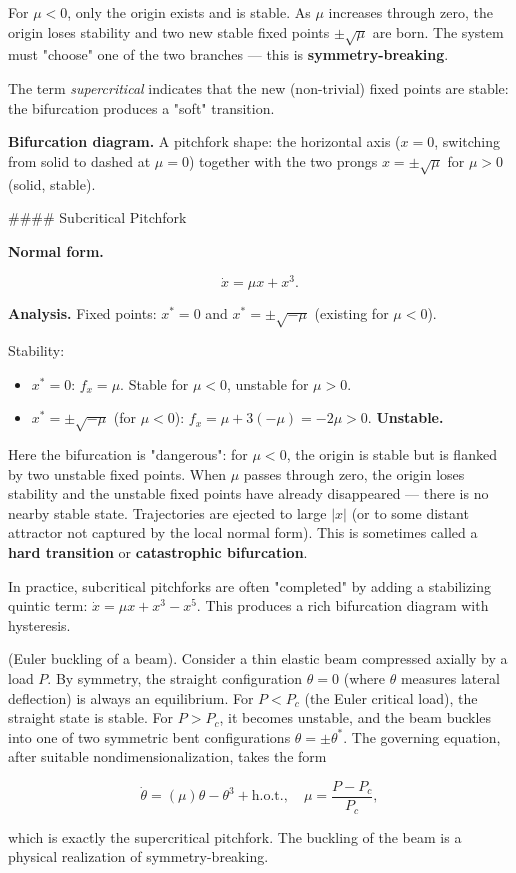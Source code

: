 For $\mu < 0$, only the origin exists and is stable. As $\mu$ increases through zero, the origin loses stability and two new stable fixed points $\pm\sqrt{\mu}$ are born. The system must "choose" one of the two branches --- this is \textbf{symmetry-breaking}.

The term \textit{supercritical} indicates that the new (non-trivial) fixed points are stable: the bifurcation produces a "soft" transition.

\textbf{Bifurcation diagram.} A pitchfork shape: the horizontal axis ($x = 0$, switching from solid to dashed at $\mu = 0$) together with the two prongs $x = \pm\sqrt{\mu}$ for $\mu > 0$ (solid, stable).

\#\#\#\# Subcritical Pitchfork

\textbf{Normal form.}

\begin{equation}\label{eq:5.4}\tag{5.4}
\dot{x} = \mu x + x^3.
\end{equation}

\textbf{Analysis.} Fixed points: $x^* = 0$ and $x^* = \pm\sqrt{-\mu}$ (existing for $\mu < 0$).

Stability:
\begin{itemize}[nosep]
  \item $x^* = 0$: $f_x = \mu$. Stable for $\mu < 0$, unstable for $\mu > 0$.
  \item $x^* = \pm\sqrt{-\mu}$ (for $\mu < 0$): $f_x = \mu + 3(-\mu) = -2\mu > 0$. \textbf{Unstable.}
\end{itemize}

Here the bifurcation is "dangerous": for $\mu < 0$, the origin is stable but is flanked by two unstable fixed points. When $\mu$ passes through zero, the origin loses stability and the unstable fixed points have already disappeared --- there is no nearby stable state. Trajectories are ejected to large $|x|$ (or to some distant attractor not captured by the local normal form). This is sometimes called a \textbf{hard transition} or \textbf{catastrophic bifurcation}.

In practice, subcritical pitchforks are often "completed" by adding a stabilizing quintic term: $\dot{x} = \mu x + x^3 - x^5$. This produces a rich bifurcation diagram with hysteresis.

\begin{example}
(Euler buckling of a beam). Consider a thin elastic beam compressed axially by a load $P$. By symmetry, the straight configuration $\theta = 0$ (where $\theta$ measures lateral deflection) is always an equilibrium. For $P < P_c$ (the Euler critical load), the straight state is stable. For $P > P_c$, it becomes unstable, and the beam buckles into one of two symmetric bent configurations $\theta = \pm\theta^*$. The governing equation, after suitable nondimensionalization, takes the form

\[
\dot{\theta} = (\mu)\theta - \theta^3 + \text{h.o.t.}, \quad \mu = \frac{P - P_c}{P_c},
\]

which is exactly the supercritical pitchfork. The buckling of the beam is a physical realization of symmetry-breaking.
\end{example}


